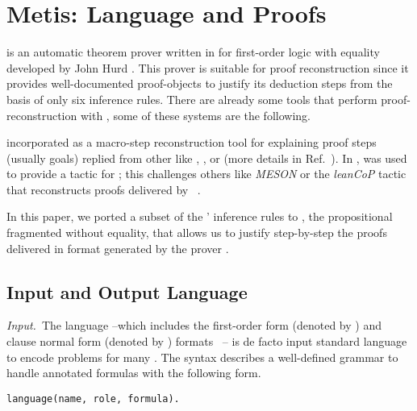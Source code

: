 \documentclass[../main.tex]{subfiles}
\begin{document}

\section{Metis: Language and Proofs}
\label{sec:metis-language-and-proofs}

\Metis is an automatic theorem prover written in 
for first-order logic with equality developed by John Hurd
\cite{hurd2003first}. This prover is suitable for proof
reconstruction since it provides well-documented proof-objects to
justify its deduction steps from the basis of only six inference
rules. There are already some tools that perform proof-reconstruction
with \Metis, some of these systems are the following.

 incorporated \Metis as a macro-step
reconstruction tool for explaining proof steps (usually \CNF goals)
replied from other \ATPs like , , or
 (more details in Ref.~\cite{paulson2007source}).
In \cite{Farber2015}, \Metis was used to provide a tactic for
; this challenges others like \emph{MESON}
or the \emph{leanCoP} tactic that reconstructs proofs
delivered by ~\cite{Farber2016}.

In this paper, we ported a subset of the \Metis' inference rules to
\Agda, the propositional fragmented without equality, that allows us to justify step-by-step the proofs delivered in
\TSTP format generated by the prover \Metis.


\subsection{Input and Output Language}
\label{ssec:input-and-output-language}

\textit{Input.}~The \TPTP language --which includes the first-order
form (denoted by ) and clause normal form (denoted by
) formats~\cite{sutcliffe2009} -- is de facto input
standard language to encode problems for many \ATPs. The \TPTP
syntax describes a well-defined grammar to handle annotated formulas
with the following form.

\begin{verbatim}
language(name, role, formula).
\end{verbatim}
\end{document}
